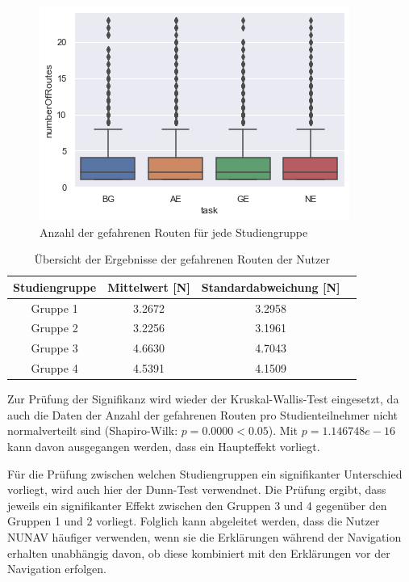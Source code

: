 \begin{figure}
    \includegraphics{contents/06_model_evaluation/res/Usage_Result_Overview.png}
    \caption{Anzahl der gefahrenen Routen für jede Studiengruppe}
\end{figure}

\begin{table}
    \begin{center}
        \begin{tabular}{|c|c|c|c|}
            \hline
            \textbf{Studiengruppe}  & \textbf{Mittelwert} [N] & \textbf{Standardabweichung} [N] \\ \hline
            Gruppe 1                & 3.2672 & 3.2958 \\ \hline
            Gruppe 2                & 3.2256 & 3.1961 \\ \hline
            Gruppe 3                & 4.6630 & 4.7043 \\ \hline
            Gruppe 4                & 4.5391 & 4.1509 \\ \hline
        \end{tabular}
    \end{center}
    \caption{Übersicht der Ergebnisse der gefahrenen Routen der Nutzer}
    \label{tab:study_offroute_results_2}
\end{table}

Zur Prüfung der Signifikanz wird wieder der Kruskal-Wallis-Test eingesetzt, da auch die Daten der Anzahl der gefahrenen Routen pro Studienteilnehmer nicht normalverteilt sind (Shapiro-Wilk: $ p = 0.0000 < 0.05 $). Mit $ p = 1.146748e-16 $ kann davon ausgegangen werden, dass ein Haupteffekt vorliegt.

Für die Prüfung zwischen welchen Studiengruppen ein signifikanter Unterschied vorliegt, wird auch hier der Dunn-Test verwendnet. Die Prüfung ergibt, dass jeweils ein signifikanter Effekt zwischen den Gruppen 3 und 4 gegenüber den Gruppen 1 und 2 vorliegt. Folglich kann abgeleitet werden, dass die Nutzer NUNAV häufiger verwenden, wenn sie die Erklärungen während der Navigation erhalten unabhängig davon, ob diese kombiniert mit den Erklärungen vor der Navigation erfolgen.

